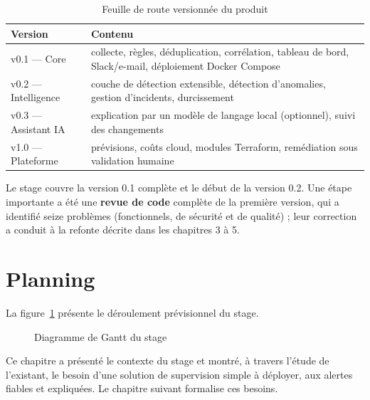 \begin{table}[htbp]
\centering
\small
\begin{tabularx}{\linewidth}{L{3.4cm}Y}
\toprule
\textbf{Version} & \textbf{Contenu} \\
\midrule
v0.1 --- Core & collecte, règles, déduplication, corrélation, tableau de bord, Slack/e-mail, déploiement Docker Compose \\
v0.2 --- Intelligence & couche de détection extensible, détection d'anomalies, gestion d'incidents, durcissement \\
v0.3 --- Assistant IA & explication par un modèle de langage local (optionnel), suivi des changements \\
v1.0 --- Plateforme & prévisions, coûts cloud, modules Terraform, remédiation sous validation humaine \\
\bottomrule
\end{tabularx}
\caption{Feuille de route versionnée du produit}
\label{tab:roadmap}
\end{table}

Le stage couvre la version 0.1 complète et le début de la version 0.2. Une étape importante
a été une \textbf{revue de code} complète de la première version, qui a identifié seize
problèmes (fonctionnels, de sécurité et de qualité) ; leur correction a conduit à la refonte
décrite dans les chapitres 3 à 5.

\section{Planning}

La figure~\ref{fig:gantt} présente le déroulement prévisionnel du stage.

\begin{figure}[htbp]
\centering
\resizebox{!}{0.4\textheight}{}
\caption{Diagramme de Gantt du stage }
\label{fig:gantt}
\end{figure}

\begin{conclusionchapitre}
Ce chapitre a présenté le contexte du stage et montré, à travers l'étude de l'existant, le
besoin d'une solution de supervision simple à déployer, aux alertes fiables et expliquées.
Le chapitre suivant formalise ces besoins.
\end{conclusionchapitre}
